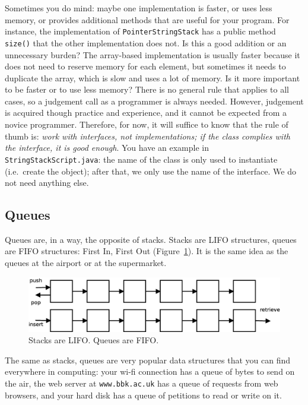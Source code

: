 Sometimes you do mind: maybe one implementation is faster, or uses
less memory, or provides additional methods that are useful for your
program. For instance, the implementation of \verb+PointerStringStack+
has a public method \verb+size()+ that the other implementation does
not. Is this a good addition or an unnecessary burden? The array-based
implementation is usually faster because it does not need to reserve
memory for each element, but sometimes it needs to duplicate the
array, which is slow and uses a lot of memory. Is it more important to
be faster or to use less memory? There is no
general rule that applies to all cases, so a judgement call as a
programmer is always needed. However, judgement is acquired though
practice and experience, and it cannot be expected from a novice
programmer. Therefore, for 
now, it will suffice to know that the rule of thumb is: \emph{work
  with interfaces, not implementations; if the class complies with the
  interface, it is good enough}. You have an example in
\verb+StringStackScript.java+: the name of the class is only used to
instantiate (i.e.~create the object); after that, we only use the name
of the interface. We do not need anything else. 

\subsection{Queues}
\label{sec:queues}

Queues are, in a way, the opposite of stacks. Stacks are LIFO
structures, queues are FIFO structures: First In, First 
Out (Figure~\ref{fig:fifolifo}). It is the
same idea as the queues at the airport or at the supermarket. 

\begin{figure}[hbtp]
  \centering
  \includegraphics[width=\textwidth]{gfx/fifo-lifo}
  \caption{Stacks are LIFO. Queues are FIFO.}
  \label{fig:fifolifo}
\end{figure}

The same as stacks, queues are very popular data structures that you
can find everywhere in computing: your wi-fi connection has a queue of
bytes to send on the air, the web server at \verb+www.bbk.ac.uk+ has a
queue of requests from web browsers, and your hard disk has a queue of
petitions to read or write on it. 

